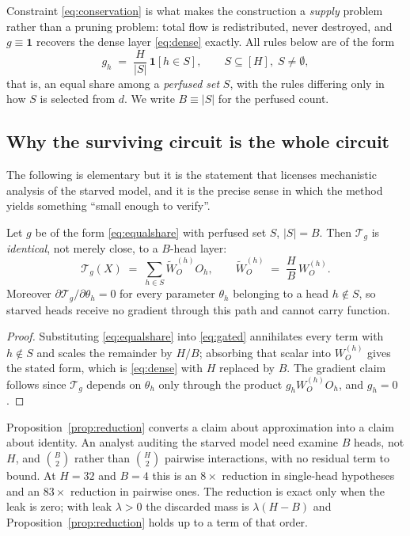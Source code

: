 Constraint \eqref{eq:conservation} is what makes the construction a \emph{supply}
problem rather than a pruning problem: total flow is redistributed, never destroyed,
and $g \equiv \mathbf{1}$ recovers the dense layer \eqref{eq:dense} exactly. All rules
below are of the form
\begin{equation}
  \label{eq:equalshare}
  g_h \;=\; \frac{H}{|S|}\,\mathbf{1}[h \in S], \qquad S \subseteq [H], \; S \neq \emptyset,
\end{equation}
that is, an equal share among a \emph{perfused set} $S$, with the rules differing only
in how $S$ is selected from $d$. We write $B \equiv |S|$ for the perfused count.

\subsection{Why the surviving circuit is the whole circuit}

The following is elementary but it is the statement that licenses mechanistic analysis
of the starved model, and it is the precise sense in which the method yields something
``small enough to verify''.

\begin{proposition}
\label{prop:reduction}
Let $g$ be of the form \eqref{eq:equalshare} with perfused set $S$, $|S| = B$. Then
$\mathcal{T}_g$ is \emph{identical}, not merely close, to a $B$-head layer:
\begin{equation}
  \mathcal{T}_g(X) \;=\; \sum_{h \in S} \widetilde{W}_O^{(h)} O_h,
  \qquad \widetilde{W}_O^{(h)} \;=\; \frac{H}{B}\, W_O^{(h)} .
\end{equation}
Moreover $\partial \mathcal{T}_g / \partial \theta_h = 0$ for every parameter $\theta_h$
belonging to a head $h \notin S$, so starved heads receive no gradient through this path
and cannot carry function.
\end{proposition}

\begin{proof}
Substituting \eqref{eq:equalshare} into \eqref{eq:gated} annihilates every term with
$h \notin S$ and scales the remainder by $H/B$; absorbing that scalar into $W_O^{(h)}$
gives the stated form, which is \eqref{eq:dense} with $H$ replaced by $B$. The gradient
claim follows since $\mathcal{T}_g$ depends on $\theta_h$ only through the product
$g_h W_O^{(h)} O_h$, and $g_h = 0$.
\end{proof}

\begin{remark}
Proposition~\ref{prop:reduction} converts a claim about approximation into a claim about
identity. An analyst auditing the starved model need examine $B$ heads, not $H$, and
$\binom{B}{2}$ rather than $\binom{H}{2}$ pairwise interactions, with no residual term to
bound. At $H = 32$ and $B = 4$ this is an $8\times$ reduction in single-head hypotheses
and an $83\times$ reduction in pairwise ones. The reduction is exact only when the leak is
zero; with leak $\lambda > 0$ the discarded mass is $\lambda(H - B)$ and
Proposition~\ref{prop:reduction} holds up to a term of that order.
\end{remark}

